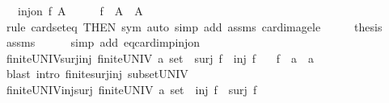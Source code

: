 \begin{isabellebody}
\ \ \ {\isachardoublequoteopen}inj{\isacharunderscore}{\kern0pt}on\ f\ A{\isachardoublequoteclose}\isanewline
%
\isadelimproof
%
\endisadelimproof
%
\isatagproof
{}\isamarkupfalse%
\ {\isacharminus}{\kern0pt}\isanewline
\ \ \isamarkupfalse%
\ {\isachardoublequoteopen}f\ {\isacharbackquote}{\kern0pt}\ A\ {\isacharequal}{\kern0pt}\ A{\isachardoublequoteclose}\isanewline
\ \ \ \ \isamarkupfalse%
\ {\isacharparenleft}{\kern0pt}rule\ card{\isacharunderscore}{\kern0pt}seteq\ {\isacharbrackleft}{\kern0pt}THEN\ sym{\isacharbrackright}{\kern0pt}{\isacharparenright}{\kern0pt}\ {\isacharparenleft}{\kern0pt}auto\ simp\ add{\isacharcolon}{\kern0pt}\ assms\ card{\isacharunderscore}{\kern0pt}image{\isacharunderscore}{\kern0pt}le{\isacharparenright}{\kern0pt}\isanewline
\ \ \isamarkupfalse%
\ \isamarkupfalse%
\ {\isacharquery}{\kern0pt}thesis\ \isamarkupfalse%
\ assms\isanewline
\ \ \ \ \isamarkupfalse%
\ {\isacharparenleft}{\kern0pt}simp\ add{\isacharcolon}{\kern0pt}\ eq{\isacharunderscore}{\kern0pt}card{\isacharunderscore}{\kern0pt}imp{\isacharunderscore}{\kern0pt}inj{\isacharunderscore}{\kern0pt}on{\isacharparenright}{\kern0pt}\isanewline
{}\isamarkupfalse%
%
\endisatagproof
{\isafoldproof}%
%
\isadelimproof
\isanewline
%
\endisadelimproof
\isanewline
{}\isamarkupfalse%
\ finite{\isacharunderscore}{\kern0pt}UNIV{\isacharunderscore}{\kern0pt}surj{\isacharunderscore}{\kern0pt}inj{\isacharcolon}{\kern0pt}\ {\isachardoublequoteopen}finite{\isacharparenleft}{\kern0pt}UNIV{\isacharcolon}{\kern0pt}{\isacharcolon}{\kern0pt}\ {\isacharprime}{\kern0pt}a\ set{\isacharparenright}{\kern0pt}\ {\isasymLongrightarrow}\ surj\ f\ {\isasymLongrightarrow}\ inj\ f{\isachardoublequoteclose}\isanewline
\ \ \ f\ {\isacharcolon}{\kern0pt}{\isacharcolon}{\kern0pt}\ {\isachardoublequoteopen}{\isacharprime}{\kern0pt}a\ {\isasymRightarrow}\ {\isacharprime}{\kern0pt}a{\isachardoublequoteclose}\isanewline
%
\isadelimproof
\ \ %
\endisadelimproof
%
\isatagproof
{}\isamarkupfalse%
\ {\isacharparenleft}{\kern0pt}blast\ intro{\isacharcolon}{\kern0pt}\ finite{\isacharunderscore}{\kern0pt}surj{\isacharunderscore}{\kern0pt}inj\ subset{\isacharunderscore}{\kern0pt}UNIV{\isacharparenright}{\kern0pt}%
\endisatagproof
{\isafoldproof}%
%
\isadelimproof
\isanewline
%
\endisadelimproof
\isanewline
{}\isamarkupfalse%
\ finite{\isacharunderscore}{\kern0pt}UNIV{\isacharunderscore}{\kern0pt}inj{\isacharunderscore}{\kern0pt}surj{\isacharcolon}{\kern0pt}\ {\isachardoublequoteopen}finite{\isacharparenleft}{\kern0pt}UNIV{\isacharcolon}{\kern0pt}{\isacharcolon}{\kern0pt}\ {\isacharprime}{\kern0pt}a\ set{\isacharparenright}{\kern0pt}\ {\isasymLongrightarrow}\ inj\ f\ {\isasymLongrightarrow}\ surj\ f{\isachardoublequoteclose}\isanewline

\end{isabellebody}
